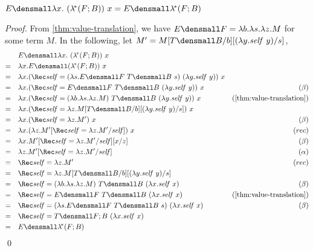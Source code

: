\begin{lemma}[$\eta\lamstar$]
  \label{thm:eta-lamstar}
  $E\den{\lambda x.~ (\lamstar (F; B)) ~ x} = E\den{\lamstar (F; B)}$
\end{lemma}
\begin{proof}
  From \cref{thm:value-translation}, we have
  $E\den{F} = \lambda b.\lambda s. \lambda z. M$ for some term $M$.  In the
  following, let
  $M' = M\subst{b}{T\den{B}}\subst{s}{(\lambda y.\mathit{self}~y)}$,
  \begin{align*}
    &\quad
    E\den{\lambda x.~ (\lamstar (F; B)) ~ x}
    \\
    =&\quad
    \lambda x. E\den{(\lamstar (F; B))} ~ x
    \\
    =&\quad
    \lambda x.
    (\Rec \mathit{self}
    = (\lambda s. E\den{F} ~ T\den{B} ~ s)
    ~ (\lambda y. \mathit{self}~y))
    ~ x
    \\
    =&\quad
    \lambda x.
    (\Rec \mathit{self} = E\den{F} ~ T\den{B} ~ (\lambda y. \mathit{self}~y))
    ~ x
    &(\beta)
    \\
    =&\quad
    \lambda x.
    (\Rec \mathit{self}
    = (\lambda b.\lambda s.\lambda z. M) ~ T\den{B}
    ~ (\lambda y. \mathit{self}~y))
    ~ x
    &(\cref{thm:value-translation})
    \\
    =&\quad
    \lambda x.
    (\Rec \mathit{self}
    = \lambda z. M\subst{b}{T\den{B}}\subst{s}{(\lambda y.\mathit{self}~y)})
    ~ x
    \\
    =&\quad
    \lambda x.
    (\Rec \mathit{self} = \lambda z. M')
    ~ x
    &(\beta)
    \\
    =&\quad
    \lambda x.
    (\lambda z.
    M'
    \subst{\mathit{self}}{\Rec \mathit{self} = \lambda z. M'})
    ~ x
    &(rec)
    \\
    =&\quad
    \lambda x.
    M'
    \subst{\mathit{self}}{\Rec \mathit{self} = \lambda z. M'}
    \subst{z}{x}
    &(\beta)
    \\
    =&\quad
    \lambda z.
    M'
    \subst{\mathit{self}}{\Rec \mathit{self} = \lambda z. M'}
    &(\alpha)
    \\
    =&\quad
    \Rec \mathit{self} = \lambda z. M'
    &(rec)
    \\
    =&\quad
    \Rec \mathit{self}
    = \lambda z. M\subst{b}{T\den{B}}\subst{s}{(\lambda y.\mathit{self}~y)}
    \\
    =&\quad
    \Rec \mathit{self}
    = (\lambda b. \lambda s. \lambda z. M) ~ T\den{B}
    ~ (\lambda x. \mathit{self} ~ x)
    &(\beta)
    \\
    =&\quad
    \Rec \mathit{self} = E\den{F} ~ T\den{B} ~ (\lambda x. \mathit{self} ~ x)
    &(\cref{thm:value-translation})
    \\
    =&\quad
    \Rec \mathit{self}
    = (\lambda s. E\den{F} ~ T\den{B} ~ s)
    ~ (\lambda x. \mathit{self} ~ x)
    &(\beta)
    \\
    =&\quad
    \Rec \mathit{self} = T\den{F; B} ~ (\lambda x. \mathit{self} ~ x)
    \\
    =&\quad
    E\den{\lamstar(F; B)}
  \end{align*}
  \qed
\end{proof}


